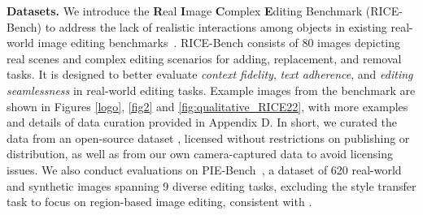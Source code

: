 \documentclass{article}
\begin{document}
\textbf{Datasets.} We introduce the \textbf{R}eal \textbf{I}mage \textbf{C}omplex \textbf{E}diting Benchmark ({RICE-Bench}) to address the lack of realistic interactions among objects in existing real-world image editing benchmarks~\citep{sheynin2024emu,gu2024multi}. RICE-Bench consists of 80 images depicting real scenes and complex editing scenarios for adding, replacement, and removal tasks. It is designed to better evaluate \textit{context fidelity}, \textit{text adherence}, and \textit{editing seamlessness} in real-world editing tasks. Example images from the benchmark are shown in {Figures \ref{logo}, \ref{fig2} and \ref{fig:qualitative_RICE22}}, with more examples and details of data curation provided in Appendix D. In short, we curated the data from an open-source dataset \citep{wasserman2024paint,ju2024pnp}, licensed without restrictions on publishing or distribution, as well as from our own camera-captured data to avoid licensing issues.  We also conduct evaluations on PIE-Bench~\cite{ju2024pnp}, a dataset of 620 real-world and synthetic images spanning 9 diverse editing tasks, excluding the style transfer task to focus on region-based image editing, consistent with \cite{li2024brushedit, xu2023infedit, zhu2025kv}.

\end{document}
